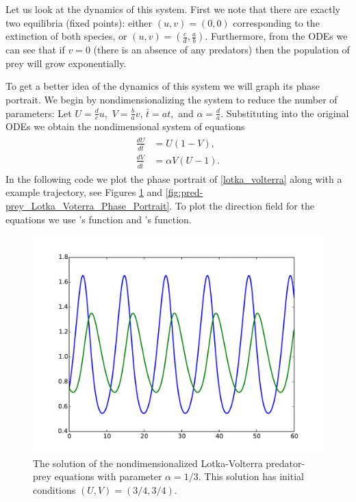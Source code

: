 Let us look at the dynamics of this system.
First we note that there are exactly two equilibria (fixed points): either $(u,v) = (0,0)$ corresponding to the extinction of both species, or $(u,v) = (\frac{c}{d},\frac{a}{b})$.
Furthermore, from the ODEs we can see that if $v=0$ (there is an absence of any predators) then the population of prey will grow exponentially.

To get a better idea of the dynamics of this system we will graph its phase portrait.
We begin by nondimensionalizing the system to reduce the number of parameters:
Let $U = \frac{d}{c}u,$ $V = \frac{b}{a}v$, $\bar{t} = at,$ and $\alpha = \frac{d}{a}$.
Substituting into the original ODEs we obtain the nondimensional system of equations
\begin{align}
	\begin{split}
	\frac{dU}{d\bar{t}} &= U(1-V),\\
	\frac{dV}{d\bar{t}} &= \alpha V (U-1).
	\end{split}\label{lotka_volterra}
\end{align}
In the following code we plot the phase portrait of \eqref{lotka_volterra} along with a example trajectory, see Figures  \ref{fig:pred-prey_Lotka_Voterra} and \ref{fig:pred-prey_Lotka_Voterra_Phase_Portrait}.
To plot the direction field for the equations we use 's  function and 's  function.

\begin{figure}
\centering
\includegraphics[width=\textwidth]{Lotka_Volterra.pdf}
\caption{The solution of the nondimensionalized Lotka-Volterra predator-prey equations with parameter $\alpha = 1/3$.
This solution has initial conditions $(U,V) = (3/4, 3/4)$.}
\label{fig:pred-prey_Lotka_Voterra}
\end{figure}

